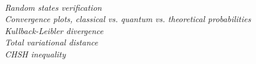 \cite{software2023}\\
\textit{Random states verification}\\
\textit{Convergence plots, classical vs. quantum vs. theoretical probabilities}\\
\textit{Kullback-Leibler divergence}\\
\textit{Total variational distance}\\
\textit{CHSH inequality}